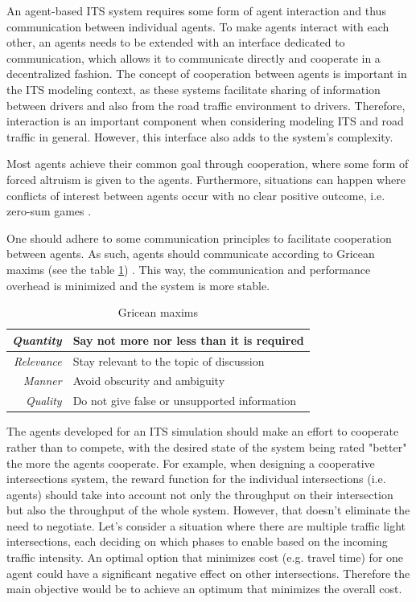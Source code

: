 \documentclass[0main.tex]{subfiles}
\begin{document}
An agent-based ITS system requires some form of agent interaction and thus communication
between individual agents. To make agents interact with each other, an agents needs to be
extended with an interface dedicated to communication, which allows it to communicate directly
and cooperate in a decentralized fashion. The concept of cooperation between agents is
important in the ITS modeling context, as these systems facilitate sharing of information
between drivers and also from the road traffic environment to drivers. Therefore, interaction
is an important component when considering modeling ITS and road traffic in general. However,
this interface also adds to the system's complexity.

Most agents achieve their common goal through cooperation, where some form of forced altruism
is given to the agents. Furthermore, situations can happen where conflicts of interest between
agents occur with no clear positive outcome, i.e. zero-sum games
\cite{ParasumannaGokulan2010}.

One should adhere to some communication principles to facilitate cooperation between agents. As
such, agents should communicate according to Gricean maxims (see the table \ref{maxims})
\cite{Shoham}. This way, the communication and performance overhead is minimized and the system 
is more stable. 


\begin{table}[htbp]
    \renewcommand{\arraystretch}{1.7}
    \setlength{\tabcolsep}{1em}
    \caption{Gricean maxims}
    \centering\begin{tabular}{>{\itshape}rl}
       \toprule
       Quantity & Say not more nor less than it is required \\ 
       \midrule
       Relevance &  Stay relevant to the topic of discussion \\
       \midrule
       Manner & Avoid obscurity and ambiguity \\ 
       \midrule
       Quality & Do not give false or unsupported information \\
       \bottomrule
    \end{tabular}
    \label{maxims}
\end{table}

The agents developed for an ITS simulation should make an effort to cooperate rather than to
compete, with the desired state of the system being rated "better" the more the agents
cooperate.  For example, when designing a cooperative intersections system, the reward function
for the individual intersections (i.e. agents) should take into account not only the throughput
on their intersection but also the throughput of the whole system. However, that doesn't
eliminate the need to negotiate. Let's consider a situation where there are multiple traffic
light intersections, each deciding on which phases to enable based on the incoming traffic
intensity.  An optimal option that minimizes cost (e.g. travel time) for one agent could have a
significant negative effect on other intersections. Therefore the main objective would be to
achieve an optimum that minimizes the overall cost.
\end{document}
